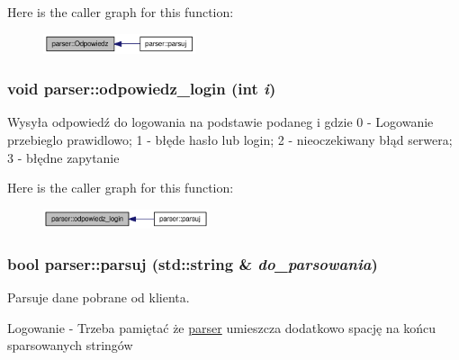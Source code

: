 Here is the caller graph for this function:\nopagebreak
\begin{figure}[H]
\begin{center}
\leavevmode
\includegraphics[width=127pt]{dd/dad/a00005_49d270636d2f3d5376c3cba62b5ea839_icgraph}
\end{center}
\end{figure}
\hypertarget{a00005_6a29174f787861caadc6c2e34b99f8c0}{
\subsubsection[{odpowiedz\_\-login}]{\setlength{\rightskip}{0pt plus 5cm}void parser::odpowiedz\_\-login (int {\em i})}}
\label{dd/dad/a00005_6a29174f787861caadc6c2e34b99f8c0}


Wysyła odpowiedź do logowania na podstawie podaneg i gdzie 0 - Logowanie przebieglo prawidlowo; 1 - błęde hasło lub login; 2 - nieoczekiwany błąd serwera; 3 - błędne zapytanie 

Here is the caller graph for this function:\nopagebreak
\begin{figure}[H]
\begin{center}
\leavevmode
\includegraphics[width=138pt]{dd/dad/a00005_6a29174f787861caadc6c2e34b99f8c0_icgraph}
\end{center}
\end{figure}
\hypertarget{a00005_9ce7290217bd14e4efcbe2cad32ccf95}{
\subsubsection[{parsuj}]{\setlength{\rightskip}{0pt plus 5cm}bool parser::parsuj (std::string \& {\em do\_\-parsowania})}}
\label{dd/dad/a00005_9ce7290217bd14e4efcbe2cad32ccf95}


Parsuje dane pobrane od klienta. 



Logowanie - Trzeba pamiętać że \hyperlink{a00005}{parser} umieszcza dodatkowo spację na końcu sparsowanych stringów

